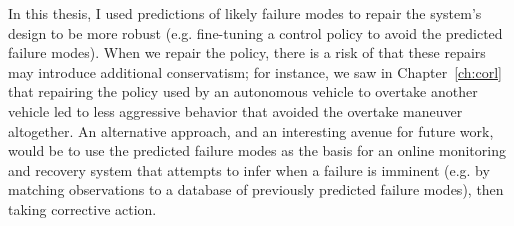 In this thesis, I used predictions of likely failure modes to repair the system's design to be more robust (e.g. fine-tuning a control policy to avoid the predicted failure modes). When we repair the policy, there is a risk of that these repairs may introduce additional conservatism; for instance, we saw in Chapter~\ref{ch:corl} that repairing the policy used by an autonomous vehicle to overtake another vehicle led to less aggressive behavior that avoided the overtake maneuver altogether. An alternative approach, and an interesting avenue for future work, would be to use the predicted failure modes as the basis for an online monitoring and recovery system that attempts to infer when a failure is imminent (e.g. by matching observations to a database of previously predicted failure modes), then taking corrective action.
